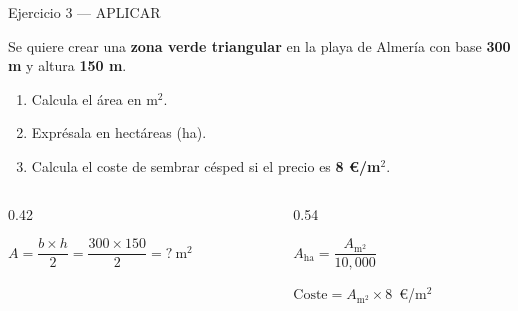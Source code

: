 \documentclass[aspectratio=169, 10pt, spanish]{beamer}
\begin{document}

\begin{frame}{Ejercicio 3 — APLICAR }
  \begin{aplicarbox}
    \AlmFontSmall Se quiere crear una \textbf{zona verde triangular}
    en la playa de Almería con base \textbf{300 m}
    y altura \textbf{150 m}.
    \begin{enumerate}
      \item Calcula el área en m$^2$.
      \item Exprésala en hectáreas (ha).
      \item Calcula el coste de sembrar césped
            si el precio es \textbf{8 €/m$^2$}.
    \end{enumerate}
  \end{aplicarbox} 
  \begin{columns}[c]
    \begin{column}{0.42\textwidth}
      \begin{center}
      \end{center}
      
            \begin{pasobox}[1]
              \AlmFontScript $A = \dfrac{b \times h}{2}
                = \dfrac{300 \times 150}{2} = ?\ \text{m}^2$
            \end{pasobox}
    \end{column}
    \begin{column}{0.54\textwidth}
      \begin{pasobox}[2]
        \AlmFontScript $A_{\text{ha}} = \dfrac{A_{\text{m}^2}}{10{,}000}$
      \end{pasobox}
      \vspace{0.15cm}
      \begin{pasobox}[3]
        \AlmFontScript $\text{Coste} = A_{\text{m}^2} \times 8$~€/m$^2$
      \end{pasobox}
    \end{column}
  \end{columns}
\end{frame}
\end{document}
